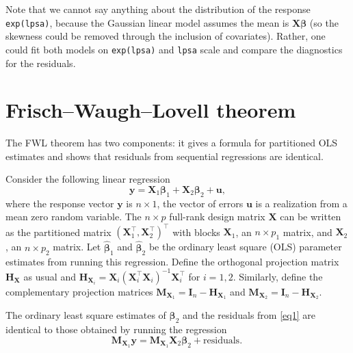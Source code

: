 \documentclass[]{book}
\theoremstyle{definition}
\theoremstyle{definition}
\theoremstyle{definition}
\theoremstyle{remark}
\let\BeginKnitrBlock\begin \let\EndKnitrBlock\end
\begin{document}
Note that we cannot say anything about the distribution of the response \texttt{exp(lpsa)}, because the Gaussian linear model assumes the mean is \(\mathbf{X}\boldsymbol{\beta}\) (so the skewness could be removed through the inclusion of covariates). Rather, one could fit both models on \texttt{exp(lpsa)} and \texttt{lpsa} scale and compare the diagnostics for the residuals.

\hypertarget{frischwaughlovell-theorem}{%
\chapter{Frisch--Waugh--Lovell theorem}\label{frischwaughlovell-theorem}}

The FWL theorem has two components: it gives a formula for partitioned OLS estimates and shows that residuals from sequential regressions are identical.

Consider the following linear regression
\[
 {\boldsymbol{y}}= \mathbf{X}_1\boldsymbol{\beta}_1+\mathbf{X}_2\boldsymbol{\beta}_2+ \boldsymbol{u}, \label{eq1}
\]
where the response vector \({\boldsymbol{y}}\) is \(n \times 1\), the vector of errors \(\boldsymbol{u}\) is a realization from a mean zero random
variable. The \(n \times p\) full-rank design matrix \(\mathbf{X}\) can be written as the partitioned
matrix \((\mathbf{X}_1^\top, \mathbf{X}_2^\top)^\top\) with blocks \(\mathbf{X}_1\), an \(n \times p_1\) matrix, and \(\mathbf{X}_2\), an \(n \times p_2\) matrix. Let
\(\hat{\boldsymbol{\beta}}_1\)
and \(\hat{\boldsymbol{\beta}}_2\) be the ordinary
least square (OLS) parameter estimates from running this regression. Define the orthogonal projection matrix \(\mathbf{H}_\mathbf{X}\) as usual and
\(\mathbf{H}_{\mathbf{X}_i} = \mathbf{X}_i(\mathbf{X}_i^\top\mathbf{X}_i)^{-1}\mathbf{X}_i^\top\) for \(i=1, 2\). Similarly,
define the complementary projection matrices \(\mathbf{M}_{\mathbf{X}_1}=\mathbf{I}_n-\mathbf{H}_{\mathbf{X}_1}\) and \(\mathbf{M}_{\mathbf{X}_2}=\mathbf{I}_n-\mathbf{H}_{\mathbf{X}_2}\).

\BeginKnitrBlock{theorem}
\protect\hypertarget{thm:unnamed-chunk-13}{}{\label{thm:unnamed-chunk-13} }The ordinary least square estimates of \(\boldsymbol{\beta}_2\) and the residuals from \eqref{eq1} are identical to those obtained by
running the regression
\[
 \mathbf{M}_{\mathbf{X}_1}{\boldsymbol{y}}= \mathbf{M}_{\mathbf{X}_1}\mathbf{X}_2\boldsymbol{\beta}_2 + \text{residuals}. \label{eq2} \
\]
\EndKnitrBlock{theorem}
\end{document}
